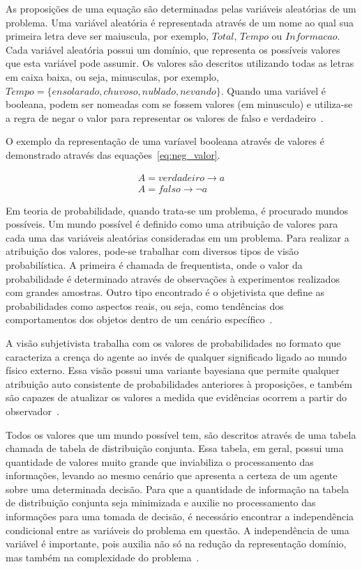 As proposições de uma equação são determinadas pelas variáveis aleatórias de um problema. Uma variável aleatória é representada através de um nome ao qual sua primeira letra deve ser maiuscula, por exemplo, $Total$, $Tempo$ ou $Informacao$. Cada variável aleatória possui um domínio, que representa os possíveis valores que esta variável pode assumir. Os valores são descritos utilizando todas as letras em caixa baixa, ou seja, minusculas, por exemplo, $Tempo = \{ ensolarado, chuvoso, nublado, nevando \}$. Quando uma variável é booleana, podem ser nomeadas com se fossem valores (em minusculo) e utiliza-se a regra de negar o valor para representar os valores de falso e verdadeiro~\cite{russell:2002}.

O exemplo da representação de uma varíavel booleana através de valores é demonstrado através das equações~\ref{eq:neg_valor}.

\begin{subequations}
    \label{eq:neg_valor}
    \begin{align}
        A = verdadeiro \rightarrow a\\
        A = falso \rightarrow \neg a
    \end{align}
\end{subequations}

Em teoria de probabilidade, quando trata-se um problema, é procurado mundos possíveis. Um mundo possível é definido como uma atribuição de valores para cada uma das variáveis aleatórias consideradas em um problema. Para realizar a atribuição dos valores, pode-se trabalhar com diversos tipos de visão probabilística. A primeira é chamada de frequentista, onde o valor da probabilidade é determinado através de observações à experimentos realizados com grandes amostras. Outro tipo encontrado é o objetivista que define as probabilidades como aspectos reais, ou seja, como tendências dos comportamentos dos objetos dentro de um cenário específico~\cite{russell:2002}.

A visão subjetivista trabalha com os valores de probabilidades no formato que caracteriza a crença do agente ao invés de qualquer significado ligado ao mundo físico externo. Essa visão possui uma variante bayesiana que permite qualquer atribuição auto consistente de probabilidades anteriores à proposições, e também são capazes de atualizar os valores a medida que evidências ocorrem a partir do observador~\cite{russell:2002}.

Todos os valores que um mundo possível tem, são descritos através de uma tabela chamada de tabela de distribuição conjunta. Essa tabela, em geral, possui uma quantidade de valores muito grande que inviabiliza o processamento das informações, levando ao mesmo cenário que apresenta a certeza de um agente sobre uma determinada decisão. Para que a quantidade de informação na tabela de distribuição conjunta seja minimizada e auxilie no processamento das informações para uma tomada de decisão, é necessário encontrar a independência condicional entre as variáveis do problema em questão. A independência de uma variável é importante, pois auxilia não só na redução da representação domínio, mas também na complexidade do problema~\cite{russell:2002}.

